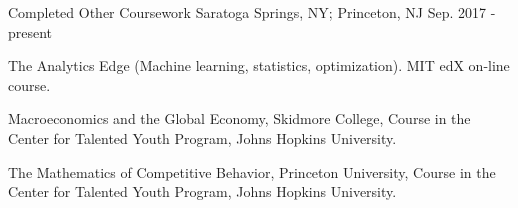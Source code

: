 \begin{cventries}
        \cventry
      {Completed} %
      {Other Coursework} %
      {Saratoga Springs, NY; Princeton, NJ} %
      {Sep. 2017 - present} %
      {
        \begin{cvitems} %
          \item { The Analytics Edge (Machine learning, statistics, optimization). MIT edX on-line course.}
          \item {Macroeconomics and the Global Economy, Skidmore College, Course in the Center for Talented Youth Program, Johns Hopkins University.}
          \item {The Mathematics of Competitive Behavior, Princeton University, Course in the Center for Talented Youth Program, Johns Hopkins University.}
        \end{cvitems}
      }
    
\end{cventries}
